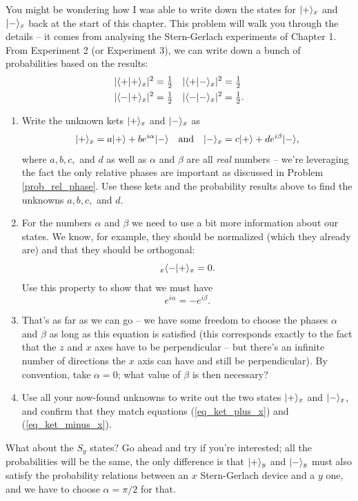 \begin{problem}
\label{prob_Sx_states}
You might be wondering how I was able to write down the states for $| + \rangle_x$ and $| - \rangle_x$ back at the start of this chapter.  This problem will walk you through the details -- it comes from analysing the Stern-Gerlach experiments of Chapter 1.  From Experiment 2 (or Experiment 3), we can write down a bunch of probabilities based on the results:
\begin{align*}
|\langle + | + \rangle_x|^2 & = \tfrac{1}{2} \quad |\langle + | - \rangle_x|^2 = \tfrac{1}{2} \\
|\langle - | + \rangle_x|^2 & = \tfrac{1}{2} \quad |\langle - | - \rangle_x|^2 = \tfrac{1}{2} .
\end{align*}
\begin{enumerate}[label=(\alph*)] 
\item Write the unknown kets $| + \rangle_x$ and $| - \rangle_x$ as
\[
| + \rangle_x = a | + \rangle + b e^{i\alpha}| - \rangle \quad \text{and} \quad | - \rangle_x = c | + \rangle + d e^{i\beta}| - \rangle,
\]
where $a,b,c,$ and $d$ as well as $\alpha$ and $\beta$ are all \emph{real} numbers -- we're leveraging the fact the only relative phases are important as discussed in Problem \ref{prob_rel_phase}.  Use these kets and the probability results above to find the unknowns $a,b,c,$ and $d$.
\item For the numbers $\alpha$ and $\beta$ we need to use a bit more information about our states.  We know, for example, they should be normalized (which they already are) and that they should be orthogonal:
\[
_x\langle - | + \rangle_x = 0.
\]
Use this property to show that we must have
\[
e^{i\alpha} = -e^{i\beta}.
\]
\item That's as far as we can go -- we have some freedom to choose the phases $\alpha$ and $\beta$ as long as this equation is satisfied (this corresponds exactly to the fact that the $z$ and $x$ axes have to be perpendicular -- but there's an infinite number of directions the $x$ axis can have and still be perpendicular).  By convention, take $\alpha = 0$; what value of $\beta$ is then necessary?
\item Use all your now-found unknowns to write out the two states $| + \rangle_x$ and $| - \rangle_x$, and confirm that they match equations (\ref{eq_ket_plus_x}) and (\ref{eq_ket_minus_x}).

\end{enumerate}

What about the $S_y$ states?  Go ahead and try if you're interested; all the probabilities will be the same, the only difference is that $| + \rangle_y$ and $| - \rangle_y$ must also satisfy the probability relations between an $x$ Stern-Gerlach device and a $y$ one, and we have to choose $\alpha = \pi/2$ for that.

\end{problem}

